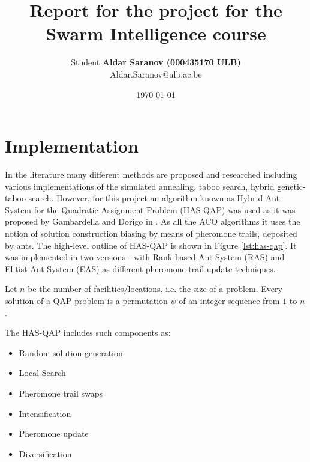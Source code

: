 \documentclass[12pt]{article}
\author{Student \textbf{Aldar Saranov (000435170 ULB)} \\ Aldar.Saranov@ulb.ac.be}
\date{\today}
\title{Report for the project for the Swarm Intelligence course}
\begin{document}
\maketitle
\newpage
\tableofcontents
\newpage



\section{Implementation}

In the literature many different methods are proposed and researched including various implementations of the simulated annealing, taboo search, hybrid genetic-taboo search. However, for this project an algorithm known as Hybrid Ant System for the Quadratic Assignment Problem (HAS-QAP) was used as it was proposed by Gambardella and Dorigo in \cite{Gambardella}. As all the ACO algorithms it uses the notion of solution construction biasing by means of pheromone trails, deposited by ants. The high-level outline of HAS-QAP is shown in Figure \ref{lst:has-qap}. It was implemented in two versions - with Rank-based Ant System (RAS) and Elitist Ant System (EAS) as different pheromone trail update techniques.

Let $n$ be the number of facilities/locations, i.e. the size of a problem. Every solution of a QAP problem is a permutation $\psi$ of an integer sequence from $1$ to $n$.

The HAS-QAP includes such components as:

\begin{itemize}
\item Random solution generation
\item Local Search
\item Pheromone trail swaps
\item Intensification
\item Pheromone update
\item Diversification
\end{itemize}
\end{document}

